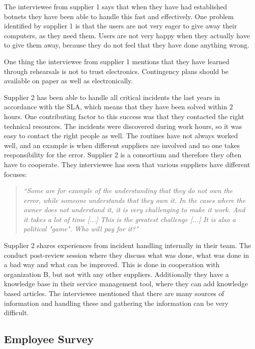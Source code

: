 The interviewee from supplier 1 says that when they have had established botnets they have been able to handle this fast and effectively. One problem identified by supplier 1 is that the users are not very eager to give away their computers, as they need them. Users are not very happy when they actually have to give them away, because they do not feel that they have done anything wrong.

One thing the interviewee from supplier 1 mentions that they have learned through rehearsals is not to trust electronics. Contingency plans should be available on paper as well as electronically.

Supplier 2 has been able to handle all critical incidents the last years in accordance with the \ac{SLA}, which means that they have been solved within 2 hours. One contributing factor to this success was that they contacted the right technical resources. The incidents were discovered during work hours, so it was easy to contact the right people as well. The routines have not always worked well, and an example is when different suppliers are involved and no one takes responsibility for the error. Supplier 2 is a consortium and therefore they often have to cooperate. They interviewee has seen that various suppliers have different focuses:

\begin{quote}
\textit{``Some are for example of the understanding that they do not own the error, while someone understands that they own it. In the cases where the owner does not understand it, it is very challenging to make it work. And it takes a lot of time [...] This is the greatest challenge [...] It is also a political "game". Who will pay for it?"}
\end{quote}

Supplier 2 shares experiences from incident handling internally in their team. The conduct post-review session where they discuss what was done, what was done in a bad way and what can be improved. This is done in cooperation with organization B, but not with any other suppliers. Additionally they have a knowledge base in their service management tool, where they can add knowledge based articles. The interviewee mentioned that there are many sources of information and handling these and gathering the information can be very difficult.

\subsection{Employee Survey}